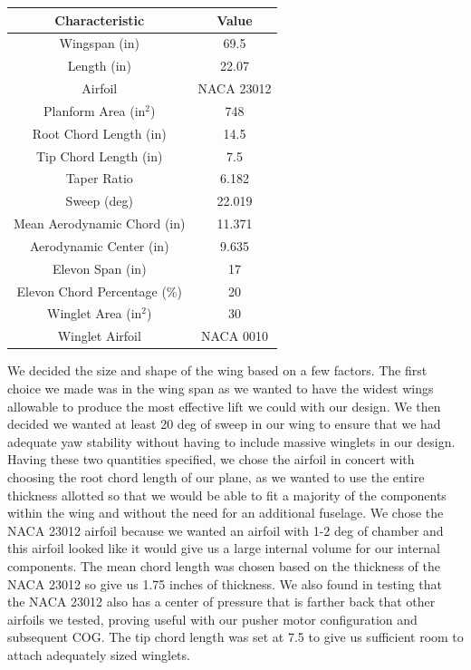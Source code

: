     \begin{center}
    \begin{tabular}{|c|c|} 
        \hline
        \textbf{Characteristic} & \textbf{Value} \\ \hline
        Wingspan (in) & 69.5 \\ \hline
        Length (in) & 22.07 \\ \hline
        Airfoil & NACA 23012 \\ \hline
        Planform Area (in$^2$) & 748 \\ \hline
        Root Chord Length (in) & 14.5 \\ \hline
        Tip Chord Length (in) & 7.5 \\ \hline
        Taper Ratio & 6.182 \\ \hline
        Sweep (deg) & 22.019 \\ \hline
        Mean Aerodynamic Chord (in) &  11.371 \\ \hline
        Aerodynamic Center (in) & 9.635 \\ \hline
        Elevon Span (in) & 17 \\ \hline
        Elevon Chord Percentage (\%) & 20 \\ \hline
        Winglet Area (in$^2$) & 30 \\ \hline
        Winglet Airfoil & NACA 0010 \\
        \hline
    \end{tabular}
    \end{center}

    We decided the size and shape of the wing based on a few factors. The first choice we made was in the wing span as we wanted to have the widest wings allowable to produce the most effective lift we could with our design. We then decided we wanted at least 20 deg of sweep in our wing to ensure that we had adequate yaw stability without having to include massive winglets in our design. Having these two quantities specified, we chose the airfoil in concert with choosing the root chord length of our plane, as we wanted to use the entire thickness allotted so that we would be able to fit a majority of the components within the wing and without the need for an additional fuselage. We chose the NACA 23012 airfoil because we wanted an airfoil with 1-2 deg of chamber and this airfoil looked like it would give us a large internal volume for our internal components. The mean chord length was chosen based on the thickness of the NACA 23012 so give us 1.75 inches of thickness. We also found in testing that the NACA 23012 also has a center of pressure that is farther back that other airfoils we tested, proving useful with our pusher motor configuration and subsequent COG. The tip chord length was set at 7.5 to give us sufficient room to attach adequately sized winglets. 

